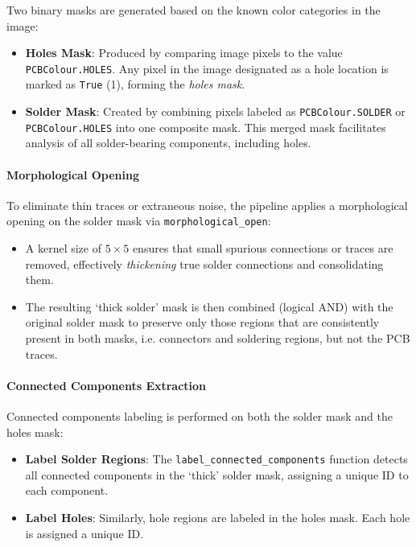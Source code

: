 \documentclass[a4paper,12pt]{article}
\begin{document}
Two binary masks are generated based on the known color categories in the image:
\begin{itemize}
    \item \textbf{Holes Mask}: Produced by comparing image pixels to the value \texttt{PCBColour.HOLES}. Any pixel in the image designated as a hole location is marked as \texttt{True} (1), forming the \emph{holes mask}.
    \item \textbf{Solder Mask}: Created by combining pixels labeled as \texttt{PCBColour.SOLDER} or \texttt{PCBColour.HOLES} into one composite mask. This merged mask facilitates analysis of all solder-bearing components, including holes.
\end{itemize}

\paragraph{Morphological Opening}

To eliminate thin traces or extraneous noise, the pipeline applies a morphological opening on the solder mask via \texttt{morphological\_open}:
\begin{itemize}
    \item A kernel size of \(5 \times 5\) ensures that small spurious connections or traces are removed, effectively \emph{thickening} true solder connections and consolidating them.
    \item The resulting `thick solder' mask is then combined (logical AND) with the original solder mask to preserve only those regions that are consistently present in both masks, i.e. connectors and soldering regions, but not the PCB traces.
\end{itemize}

\paragraph{Connected Components Extraction}

Connected components labeling is performed on both the solder mask and the holes mask:
\begin{itemize}
    \item \textbf{Label Solder Regions}: The \texttt{label\_connected\_components} function detects all connected components in the `thick' solder mask, assigning a unique ID to each component.
    \item \textbf{Label Holes}: Similarly, hole regions are labeled in the holes mask. Each hole is assigned a unique ID.
\end{itemize}
\end{document}
